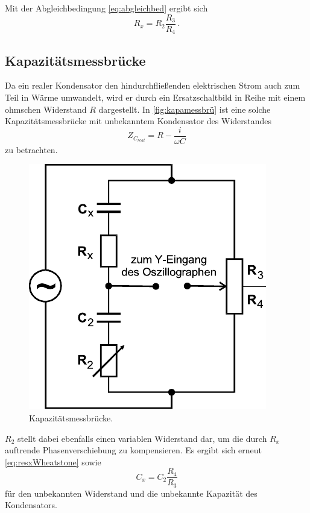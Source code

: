 Mit der Abgleichbedingung \eqref{eq:abgleichbed} ergibt sich
\begin{equation}
    R_x = R_2 \frac{R_3}{R_4} \,.
    \label{eq:resxWheatstone}
\end{equation}



\subsection{Kapazitätsmessbrücke}
\label{subsec:kapamessbrü}

Da ein realer Kondensator den hindurchfließenden elektrischen Strom auch zum Teil in Wärme umwandelt, wird er durch ein Ersatzschaltbild in Reihe mit einem ohmschen Widerstand $R$ dargestellt. 
In \autoref{fig:kapamessbrü} ist eine solche Kapazitätsmessbrücke mit unbekanntem Kondensator des Widerstandes
\begin{equation*}
    Z_{C_{real}} = R - \frac{i}{ω C}
\end{equation*} zu betrachten.

\begin{figure}[H]
    \centering
    \includegraphics{figures/Kapazitätsmessbrücke.pdf}
    \caption{Kapazitätsmessbrücke\cite{ap07}.}
    \label{fig:kapamessbrü}
\end{figure}

$R_2$ stellt dabei ebenfalls einen variablen Widerstand dar, um die durch $R_x$ auftrende Phasenverschiebung zu kompensieren.
Es ergibt sich erneut \eqref{eq:resxWheatstone} sowie
\begin{equation}
    C_x = C_2 \frac{R_4}{R_3}
    \label{eq:kapxkapbrü}
\end{equation}
für den unbekannten Widerstand und die unbekannte Kapazität des Kondensators.


